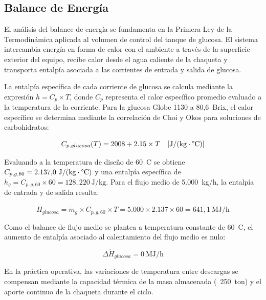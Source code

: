 \subsection{Balance de Energ\'ia}

El an\'alisis del balance de energ\'ia se fundamenta en la Primera Ley de la Termodin\'amica aplicada al volumen de control del tanque de glucosa. El sistema intercambia energ\'ia en forma de calor con el ambiente a trav\'es de la superficie exterior del equipo, recibe calor desde el agua caliente de la chaqueta y transporta entalp\'ia asociada a las corrientes de entrada y salida de glucosa.

La entalp\'ia espec\'ifica de cada corriente de glucosa se calcula mediante la expresi\'on $h = C_p \times T$, donde $C_p$ representa el calor espec\'ifico promedio evaluado a la temperatura de la corriente. Para la glucosa Globe 1130 a 80,6~\textdegree Brix, el calor espec\'ifico se determina mediante la correlaci\'on de Choi y Okos para soluciones de carbohidratos:

\begin{equation}
C_{p,glucosa}(T) = 2008 + 2{.}15 \times T \quad [\text{J/(kg} \cdot \text{\textdegree C)}]
\label{eq:Cp_glucosa}
\end{equation}

Evaluando a la temperatura de dise\~no de 60~\textdegree C se obtiene $C_{p,g,60} = 2{.}137{,}0~\text{J/(kg}\cdot\text{\textdegree C)}$ y una entalp\'ia espec\'ifica de $h_g = C_{p,g,60} \times 60 = 128{,}220~\text{J/kg}$. Para el flujo medio de 5{.}000~kg/h, la entalp\'ia de entrada y de salida resulta:

\begin{equation}
\dot{H}_{glucosa} = \dot{m}_g \times C_{p,g,60} \times T = 5{.}000 \times 2{.}137 \times 60 = 641{,}1~\text{MJ/h}
\end{equation}

Como el balance de flujo medio se plantea a temperatura constante de 60~\textdegree C, el aumento de entalp\'ia asociado al calentamiento del flujo medio es nulo:

\begin{equation}
\Delta \dot{H}_{glucosa} = 0~\text{MJ/h}
\end{equation}

En la pr\'actica operativa, las variaciones de temperatura entre descargas se compensan mediante la capacidad t\'ermica de la masa almacenada (~250~ton) y el aporte continuo de la chaqueta durante el ciclo.

